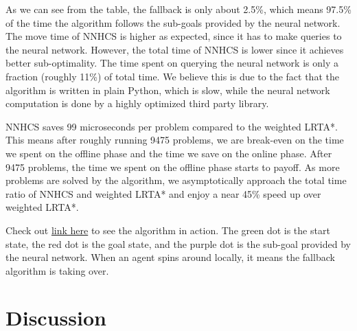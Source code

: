 \documentclass[letterpaper]{article}
\numberwithin{equation}{section}
\numberwithin{theorem}{section}
\numberwithin{lemma}{section}
\numberwithin{df}{section}
\begin{document}
    As we can see from the table, the fallback is only about 2.5\%, which means 97.5\% of the time the algorithm follows the sub-goals provided by the neural network.
    The move time of NNHCS is higher as expected, since it has to make queries to the neural network.
    However, the total time of NNHCS is lower since it achieves better sub-optimality.
    The time spent on querying the neural network is only a fraction (roughly 11\%) of total time.
    We believe this is due to the fact that the algorithm is written in plain Python, which is slow,
    while the neural network computation is done by a highly optimized third party library.

    NNHCS saves 99 microseconds per problem compared to the weighted LRTA*.
    This means after roughly running 9475 problems, we are break-even on the time we spent on the offline phase and the time we save on the online phase.
    After 9475 problems, the time we spent on the offline phase starts to payoff.
    As more problems are solved by the algorithm, we asymptotically approach the total time ratio of NNHCS and weighted LRTA* and enjoy a near 45\% speed up over weighted LRTA*.

    Check out \href{https://github.com/uduse/neural-network-for-hill-climbling-subgoals/tree/master/temp_images}{link here} to see the algorithm in action.
    The green dot is the start state, the red dot is the goal state, and the purple dot is the sub-goal provided by the neural network.
    When an agent spins around locally, it means the fallback algorithm is taking over.


    \section{Discussion}\label{sec:discussion}

\end{document}
